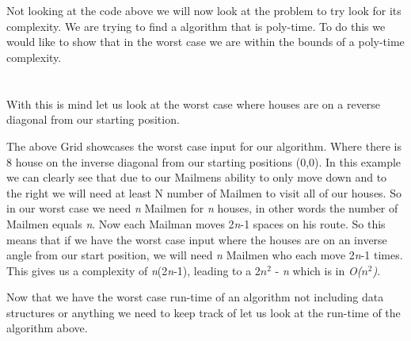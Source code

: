 \documentclass[11pt]{article}
\begin{document}
\\
\\
Not looking at the code above we will now look at the problem to try look for its complexity.
We are trying to find a algorithm that is poly-time. To do this we would like to show that in the worst case we are within the bounds of a poly-time complexity. 
\\
\\
\\
With this is mind let us look at the worst case where houses are on a reverse diagonal from our starting position.
\hfill \break
\break
{}
\hfill \break
\break
The above Grid showcases the worst case input for our algorithm. Where there is 8 house on the inverse diagonal from our starting positions (0,0). In this example we can clearly see that due to our Mailmens ability to only move down and to the right we will need at least N number of Mailmen to visit all of our houses. 
\hfill \break
\break
So in our worst case we need \textit{n} Mailmen for \textit{n} houses, in other words the number of Mailmen equals \textit{n}. Now each Mailman moves 2\textit{n}-1 spaces on his route. So this means that if we have the worst case input where the houses are on an inverse angle from our start position, we will need \textit{n} Mailmen who each move 2\textit{n}-1 times.
This gives us a complexity of \textit{n}(2\textit{n}-1), leading to a 2\textit{$n^2$} - \textit{n} which is in \textit{O($n^2$)}.

\hfill \break
\break
Now that we have the worst case run-time of an algorithm not including data structures or anything we need to keep track of let us look at the run-time of the algorithm above.

 


\pagebreak
\end{document}
